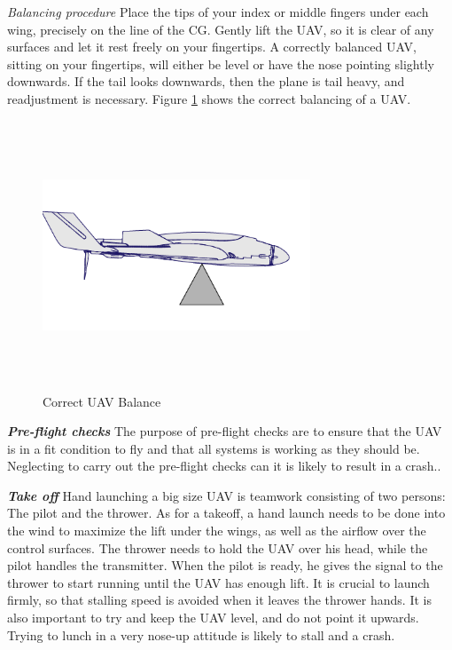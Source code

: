 \textit{Balancing procedure} Place the tips of your index or middle fingers under each wing, precisely on the line of the CG. Gently lift the UAV, so it is clear of any surfaces and let it rest freely on your fingertips.
A correctly balanced UAV, sitting on your fingertips, will either be level or have the nose pointing slightly downwards. If the tail looks downwards, then the plane is tail heavy, and readjustment is necessary. Figure \ref{fig:Balance} shows the correct balancing of a UAV.

\begin{figure}[H]
\centering
\includegraphics[width=8cm,height=8cm,keepaspectratio]{imagenes/Balance.png}
\caption{Correct UAV Balance}
\label{fig:Balance}
\end{figure}
\textit{\textbf{Pre-flight checks}} \newline
The purpose of pre-flight checks are to ensure that the UAV is in a fit condition to fly and that all systems is working as they should be.  Neglecting to carry out the pre-flight checks can it is likely to result in a crash.. 

\textit{\textbf{Take off}} \newline
Hand launching a big size UAV is teamwork consisting of two persons: The pilot and the thrower. As for a takeoff, a hand launch needs to be done into the wind to maximize the lift under the wings, as well as the airflow over the control surfaces.
The thrower needs to hold the UAV over his head, while the pilot handles the transmitter. When the pilot is ready, he gives the signal to the thrower to start running until the UAV has enough lift. It is crucial to launch firmly, so that stalling speed is avoided when it leaves the thrower hands. 
It is also important to try and keep the UAV level, and do not point it upwards. Trying to lunch in a very nose-up attitude is likely to stall and a crash.

